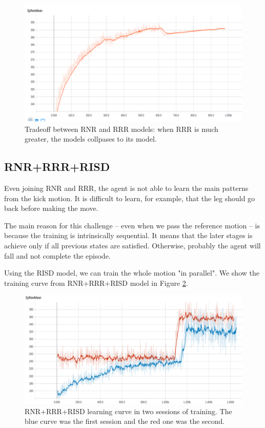 \begin{figure}[!htbp]
	\centering
	\includegraphics[width=1.0\textwidth]{Cap6/rnrrrrtradeoff.eps}
	\caption{Tradeoff between RNR and RRR models: when RRR is much greater, the models collpases to its model.}
	\label{fig:rnrrrrtradeoff}
\end{figure}

\subsection{RNR+RRR+RISD}

Even joining RNR and RRR, the agent is not able to learn the main patterns from the kick motion. It is difficult to learn, for example, that the leg should go back before making the move.

The main reason for this challenge -- even when we pass the reference motion -- is because the training is intrinsically sequential. It means that the later stages is achieve only if all previous states are satisfied. Otherwise, probably the agent will fall and not complete the episode.

Using the RISD model, we can train the whole motion "in parallel". We show the training curve from RNR+RRR+RISD model in Figure \ref{fig:rnrrrrrisdcurve}. 

\begin{figure}[!htbp]
	\centering
	\includegraphics[width=1.0\textwidth]{Cap6/rnrrrrrisdcurve.eps}
	\caption{RNR+RRR+RISD learning curve in two sessions of training. The blue curve was the first session and the red one was the second.}
	\label{fig:rnrrrrrisdcurve}
\end{figure}


